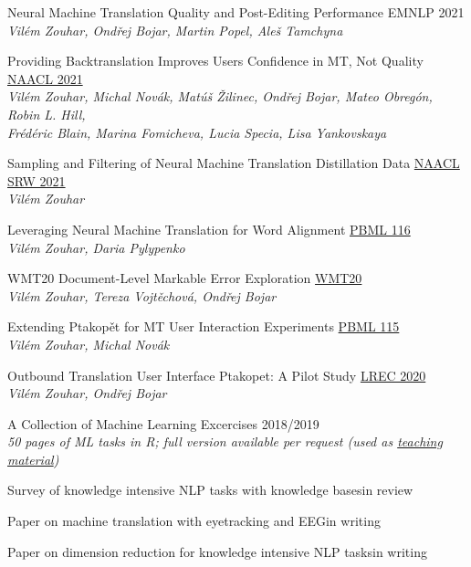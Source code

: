 \documentclass[11pt,a4paper]{article} %
\newcommand{\hSubsectionA}[2]{{#1}\hfill {#2}\hspace{-1cm}}
\newcommand{\hSubsectionB}[3]{
    {#1} \hfill {\footnotesize #2}\hspace{-1cm}\\
    \vspace{-0.2cm} \hspace{-0.17cm}\textit{\footnotesize #3}
    \vspace{0.1cm}
}
\begin{document}
\hSubsectionB
{Neural Machine Translation Quality and Post-Editing Performance}
{EMNLP 2021}
{Vilém Zouhar, Ondřej Bojar, Martin Popel, Aleš Tamchyna}

\hSubsectionB
{Providing Backtranslation Improves Users Confidence in MT, Not Quality}
{\href{https://arxiv.org/pdf/2104.05688.pdf}{NAACL 2021}}
{Vilém Zouhar, Michal Novák, Matúš Žilinec, Ondřej Bojar, Mateo Obregón, Robin L. Hill,\\ Frédéric Blain, Marina Fomicheva, Lucia Specia, Lisa Yankovskaya}
\vspace{-0.11cm}

\hSubsectionB
{Sampling and Filtering of Neural Machine Translation Distillation Data}
{\href{https://arxiv.org/pdf/2104.00664.pdf}{NAACL SRW 2021}}
{Vilém Zouhar}

\hSubsectionB
{Leveraging Neural Machine Translation for Word Alignment}
{\href{https://ufal.mff.cuni.cz/pbml/116/art-zouhar-pylypenko.pdf}{PBML 116}}
{Vilém Zouhar, Daria Pylypenko}

\hSubsectionB
{WMT20 Document-Level Markable Error Exploration}
{\href{http://www.statmt.org/wmt20/pdf/2020.wmt-1.41.pdf}{WMT20}}
{Vilém Zouhar, Tereza Vojtěchová, Ondřej Bojar}

\hSubsectionB
{Extending Ptakopět for MT User Interaction Experiments}
{\href{https://ufal.mff.cuni.cz/pbml/115/art-zouhar-novak.pdf}{PBML 115}}
{Vilém Zouhar, Michal Novák}

\hSubsectionB
{Outbound Translation User Interface Ptakopet: A Pilot Study}
{\href{https://www.aclweb.org/anthology/2020.lrec-1.860.pdf}{LREC 2020}}
{Vilém Zouhar, Ondřej Bojar}

\hSubsectionB
{A Collection of Machine Learning Excercises}
{2018/2019}
{50 pages of ML tasks in R; full version available per request (used as \href{http://ufal.mff.cuni.cz/courses/npfl054}{teaching material})}

\hSubsectionA
{Survey of knowledge intensive NLP tasks with knowledge bases}
{in review}

\hSubsectionA
{Paper on machine translation with eyetracking and EEG}
{in writing}

\hSubsectionA
{Paper on dimension reduction for knowledge intensive NLP tasks}
{in writing}
\end{document}
